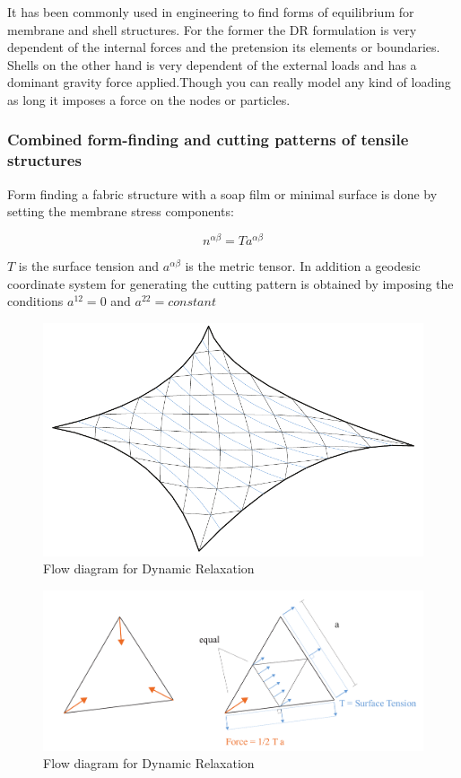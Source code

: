 It has been commonly used in engineering to find forms of equilibrium for membrane and shell structures. For the former the DR formulation is very dependent of the internal forces and the pretension its elements or boundaries. Shells on the other hand is very dependent of the external loads and has a dominant gravity force applied.Though you can really model any kind of loading as long it imposes a force on the nodes or particles.

\subsubsection{Combined form-finding and cutting patterns of tensile structures}

Form finding a fabric structure with a soap film or minimal surface is done by setting the membrane stress components:

\begin{equation}
    n^{\alpha \beta} = Ta^{\alpha \beta}
\end{equation}

$T$ is the surface tension and $a^{\alpha \beta}$ is the metric tensor. In addition a geodesic coordinate system for generating the cutting pattern is obtained by imposing the conditions $a^{12} = 0$ and  $a^{22} = constant$


\begin{figure}[H]
\centering
\includegraphics[width=0.9\linewidth ]{figure/Theory/EqualMeshGeo.pdf}
\caption{Flow diagram for Dynamic Relaxation }
\end{figure}


\begin{figure}[H]
\centering
\includegraphics[width=1.0\linewidth ]{figure/Theory/SoapbubbleElement.pdf}
\caption{Flow diagram for Dynamic Relaxation }
\end{figure}


